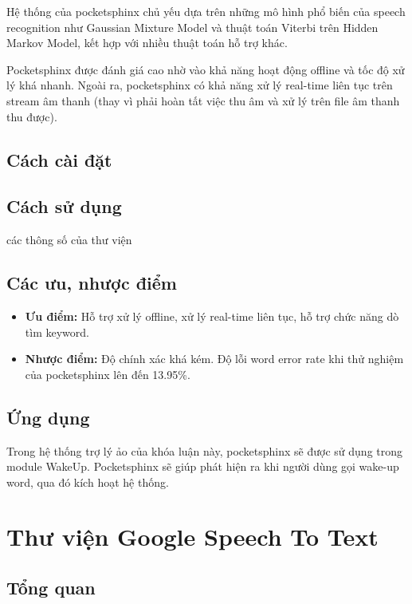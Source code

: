 Hệ thống của pocketsphinx chủ yếu dựa trên những mô hình phổ biến của speech recognition như Gaussian Mixture Model và thuật toán Viterbi trên Hidden Markov Model, kết hợp với nhiều thuật toán hỗ trợ khác\cite{huggins2006pocketsphinx}.

Pocketsphinx được đánh giá cao nhờ vào khả năng hoạt động offline và tốc độ xử lý khá nhanh. Ngoài ra, pocketsphinx có khả năng xử lý real-time liên tục trên stream âm thanh (thay vì phải hoàn tất việc thu âm và xử lý trên file âm thanh thu được).

\subsection{Cách cài đặt}

\subsection{Cách sử dụng}

các thông số của thư viện

\subsection{Các ưu, nhược điểm}

\begin{itemize}
    \item \textbf{Ưu điểm:} Hỗ trợ xử lý offline, xử lý real-time liên tục, hỗ trợ chức năng dò tìm keyword.
    \item \textbf{Nhược điểm:} Độ chính xác khá kém. Độ lỗi word error rate khi thử nghiệm của pocketsphinx lên đến 13.95\%\cite{huggins2006pocketsphinx}.
\end{itemize}

\subsection{Ứng dụng}

Trong hệ thống trợ lý ảo của khóa luận này, pocketsphinx sẽ được sử dụng trong module WakeUp. Pocketsphinx sẽ giúp phát hiện ra khi người dùng gọi wake-up word, qua đó kích hoạt hệ thống.

\section{Thư viện Google Speech To Text}

\subsection{Tổng quan}

